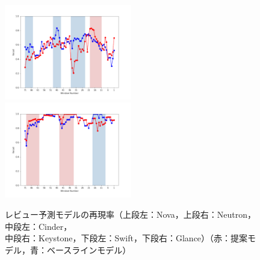 \documentclass[submit]{ipsj}
\begin{document}
\begin{figure}[t]
\begin{minipage}{\textwidth}
\begin{center}
    \includegraphics[width=0.495\textwidth]{Uenaka_fig/RQ2_result/Swift/Swift_review_Recall.pdf}
    \includegraphics[width=0.495\textwidth]{Uenaka_fig/RQ2_result/Glance/Glance_review_Recall.pdf}
    \caption{レビュー予測モデルの再現率（上段左：Nova，上段右：Neutron，中段左：Cinder，\\ 中段右：Keystone，下段左：Swift，下段右：Glance）（赤：提案モデル，青：ベースラインモデル）}
    \label{fig:review_r}
\end{center}
\vspace{0.08\textheight}
\end{minipage}
\end{figure}
\end{document}
